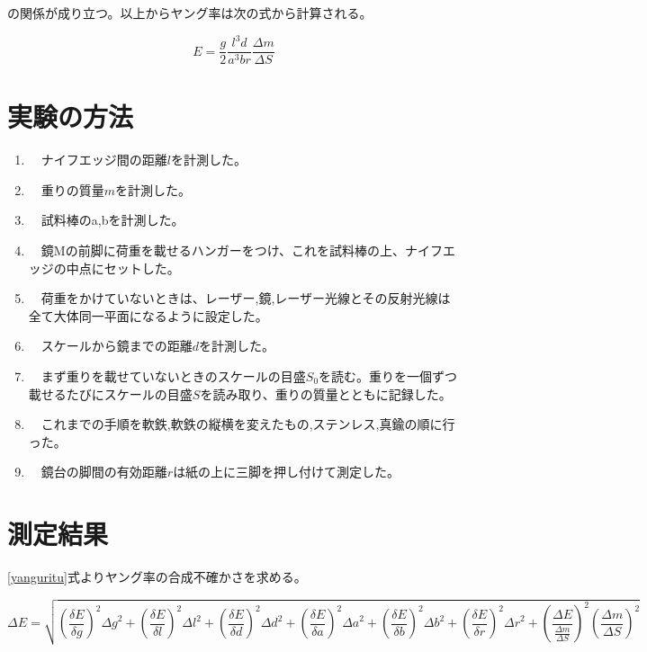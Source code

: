 \documentclass{jsarticle}
\begin{document}
の関係が成り立つ。以上からヤング率は次の式から計算される。

\begin{equation}
\label{yanguritu}
    E =\frac{g}{2}\frac{l^3d}{a^3br}\frac{\Delta m}{\Delta S}
\end{equation}

\section{実験の方法}

\begin{enumerate}
    \item　ナイフエッジ間の距離$l$を計測した。
    \item　重りの質量$m$を計測した。
    \item　試料棒のa,bを計測した。
    \item　鏡Mの前脚に荷重を載せるハンガーをつけ、これを試料棒の上、ナイフエッジの中点にセットした。
    \item　荷重をかけていないときは、レーザー,鏡,レーザー光線とその反射光線は全て大体同一平面になるように設定した。
    \item　スケールから鏡までの距離$d$を計測した。
    \item　まず重りを載せていないときのスケールの目盛$S_0$を読む。重りを一個ずつ載せるたびにスケールの目盛$S$を読み取り、重りの質量とともに記録した。
    \item　これまでの手順を軟鉄,軟鉄の縦横を変えたもの,ステンレス,真鍮の順に行った。
    \item　鏡台の脚間の有効距離$r$は紙の上に三脚を押し付けて測定した。
\end{enumerate}


\section{測定結果}

\ref{yanguritu}式よりヤング率の合成不確かさを求める。

\begin{equation}
    \label{gouseihutasikasa}
    \Delta E = \sqrt{({\frac{\delta E}{\delta g}})^2{\Delta g}^2 + ({\frac{\delta E}{\delta l}})^2{\Delta l}^2 + ({\frac{\delta E}{\delta d}})^2{\Delta d}^2  + (\frac{\delta E}{\delta a})^2{\Delta a}^2 + (\frac{\delta E}{\delta b})^2{\Delta b}^2 + (\frac{\delta E}{\delta r})^2{\Delta r}^2 + (\frac{\Delta E}{\frac{\Delta m}{\Delta S}})^2(\frac{\Delta m}{\Delta S})^2} 
\end{equation}
\end{document}
